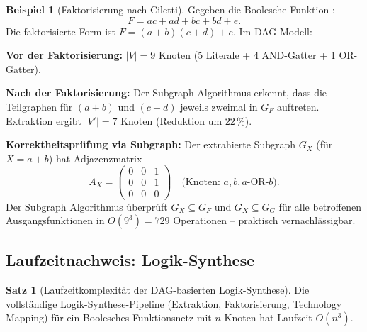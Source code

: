 ﻿\documentclass[a4paper,12pt]{article}
\theoremstyle{definition}
\newtheorem{beispiel}{Beispiel}
\newtheorem{satz}{Satz}
\begin{document}
\begin{beispiel}[Faktorisierung nach Ciletti]\label{bsp:faktorisierung}
  Gegeben die Boolesche Funktion \cite[S.~240, Beispiel 6.3]{ciletti2011}:
  \[
    F = ac + ad + bc + bd + e.
  \]
  Die faktorisierte Form ist $F = (a + b)(c + d) + e$. Im DAG-Modell:

  \textbf{Vor der Faktorisierung:} $|V| = 9$ Knoten
  (5 Literale + 4 AND-Gatter + 1 OR-Gatter).

  \textbf{Nach der Faktorisierung:} Der Subgraph Algorithmus erkennt, dass die
  Teilgraphen für $(a + b)$ und $(c + d)$ jeweils zweimal in $G_F$ auftreten.
  Extraktion ergibt $|V'| = 7$ Knoten (Reduktion um $22\,\%$).

  \textbf{Korrektheitsprüfung via Subgraph:} Der extrahierte Subgraph
  $G_X$ (für $X = a+b$) hat Adjazenzmatrix
  \[
    A_X = \begin{pmatrix} 0 & 0 & 1 \\ 0 & 0 & 1 \\ 0 & 0 & 0 \end{pmatrix}
    \quad \text{(Knoten: } a, b, a\text{-OR-}b\text{)}.
  \]
  Der Subgraph Algorithmus überprüft $G_X \subseteq G_F$ und $G_X \subseteq G_G$ für
  alle betroffenen Ausgangsfunktionen in $O(9^3) = 729$ Operationen -- praktisch
  vernachlässigbar.
\end{beispiel}

\subsection{Laufzeitnachweis: Logik-Synthese}

\begin{satz}[Laufzeitkomplexität der DAG-basierten Logik-Synthese]\label{satz:synthese_lz}
  Die vollständige Logik-Synthese-Pipeline (Extraktion, Faktorisierung, Technology
  Mapping) für ein Boolesches Funktionsnetz mit $n$ Knoten hat Laufzeit $O(n^3)$.
\end{satz}
\end{document}
